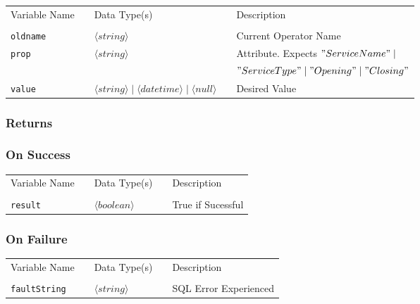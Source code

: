 \begin{tabular}{lllll}
Variable Name	&		&	Data Type(s)		&	&	Description	\\
				&	&	&	&	\\
\verb!oldname! & \hspace{15mm} & $\langle string\rangle $ & \hspace{15mm} & Current Operator Name \\
\verb!prop! & \hspace{15mm} & $\langle string\rangle $ 	& \hspace{15mm} & Attribute. Expects  $"ServiceName" \mid$ \\
	&	&	&	&	$"ServiceType"  \mid "Opening" \mid "Closing"$\\
\verb!value! & \hspace{15mm} & $\langle string\rangle  \mid \langle datetime\rangle  \mid \langle null\rangle $ & \hspace{15mm} & Desired Value \\
\end{tabular}

\subsubsection{Returns}

\subsubsection{On Success}

\begin{tabular}{lllll}
Variable Name	&		&	Data Type(s)		&	&	Description	\\
				&	&	&	&	\\
\verb!result! & \hspace{15mm} & $\langle boolean\rangle $ & \hspace{15mm} & True if Sucessful \\
\end{tabular}

\subsubsection{On Failure}

\begin{tabular}{lllll}
Variable Name	&		&	Data Type(s)		&	&	Description	\\
				&	&	&	&	\\
\verb!faultString! & \hspace{15mm} & $\langle string\rangle $ & \hspace{15mm} & SQL Error Experienced \\
\end{tabular}


